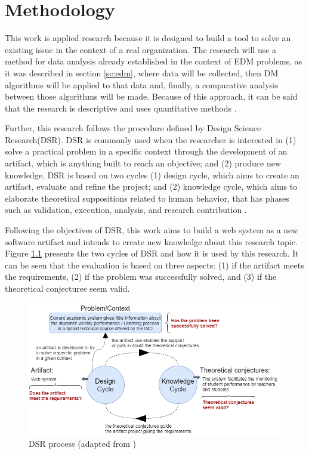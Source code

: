 \chapter{Methodology}
\label{ch:Methodology}

This work is applied research because it is designed to build a tool to solve an existing issue in the context of a real organization. The research will use a method for data analysis already established in the context of EDM problems, as it was described in section \ref{sc:edm}, where data will be collected, then DM algorithms will be applied to that data and, finally, a comparative analysis between those algorithms will be made. Because of this approach, it can be said that the research is descriptive and uses quantitative methods \cite{gomes2019classificaccao}.

Further, this research follows the procedure defined by Design Science Research(DSR). DSR is commonly used when the researcher is interested in (1) solve a practical problem in a specific context through the development of an artifact, which is anything built to reach an objective; and (2) produce new knowledge. DSR is based on two cycles (1) design cycle, which aims to create an artifact, evaluate and refine the project; and (2) knowledge cycle, which aims to elaborate theoretical suppositions related to human behavior, that has phases such as validation, execution, analysis, and research contribution \cite{pimentel2019design}.

Following the objectives of DSR, this work aims to build a web system as a new software artifact and intends to create new knowledge about this research topic. Figure \ref{fig:dsr} presents the two cycles of DSR and how it is used by this research. It can be seen that the evaluation is based on three aspects: (1) if the artifact meets the requirements, (2) if the problem was successfully solved, and (3) if the theoretical conjectures seem valid.

\begin{figure}[htb]
	\centering
  	\includegraphics[scale=.55]{Imagens/dsr.png}
  	\caption{DSR process (adapted from \cite{pimentel2019design})}
  	\label{fig:dsr}
\end{figure}

